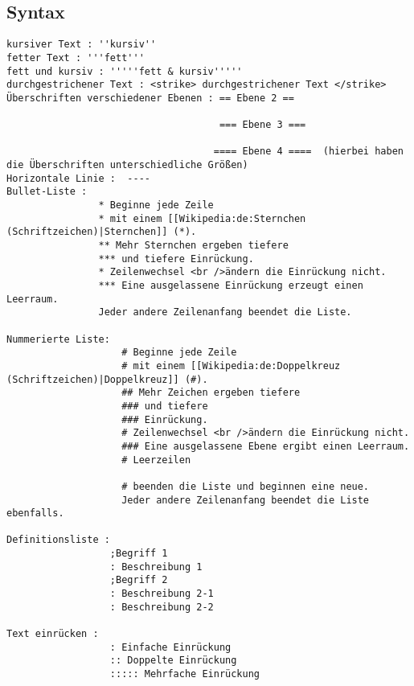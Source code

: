 \subsection{Syntax}
 \begin{verbatim}
kursiver Text : ''kursiv''
fetter Text : '''fett'''
fett und kursiv : '''''fett & kursiv'''''
durchgestrichener Text : <strike> durchgestrichener Text </strike>
Überschriften verschiedener Ebenen : == Ebene 2 ==

                                     === Ebene 3 ===

                                    ==== Ebene 4 ====  (hierbei haben die Überschriften unterschiedliche Größen)
Horizontale Linie :  ----
Bullet-Liste : 
                * Beginne jede Zeile
                * mit einem [[Wikipedia:de:Sternchen (Schriftzeichen)|Sternchen]] (*).
                ** Mehr Sternchen ergeben tiefere
                *** und tiefere Einrückung.
                * Zeilenwechsel <br />ändern die Einrückung nicht.
                *** Eine ausgelassene Einrückung erzeugt einen Leerraum.
                Jeder andere Zeilenanfang beendet die Liste.

Nummerierte Liste: 
                    # Beginne jede Zeile
                    # mit einem [[Wikipedia:de:Doppelkreuz (Schriftzeichen)|Doppelkreuz]] (#).
                    ## Mehr Zeichen ergeben tiefere
                    ### und tiefere
                    ### Einrückung.
                    # Zeilenwechsel <br />ändern die Einrückung nicht.
                    ### Eine ausgelassene Ebene ergibt einen Leerraum.
                    # Leerzeilen

                    # beenden die Liste und beginnen eine neue.
                    Jeder andere Zeilenanfang beendet die Liste ebenfalls.

Definitionsliste : 
                  ;Begriff 1
                  : Beschreibung 1
                  ;Begriff 2
                  : Beschreibung 2-1
                  : Beschreibung 2-2
                  
Text einrücken : 
                  : Einfache Einrückung
                  :: Doppelte Einrückung
                  ::::: Mehrfache Einrückung
 \end{verbatim}
